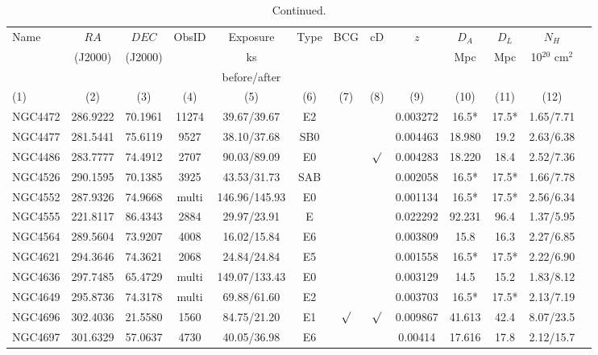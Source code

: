 \documentclass[iop]{emulateapj}
\begin{document}
\setcounter{table}{0}
\begin{table}
\centering
\caption{Continued.}
\begin{tabular}{lcccccccccccc}
\hline
Name      & $RA$ & $DEC$ & ObsID & Exposure & Type & BCG & cD  &  $z$     &  $D_A$ &  $D_L$  &  $N_{H}$ \\
          &  (J2000)   & (J2000)    &       &    ks     &      &   &      &          &   Mpc  &  Mpc    &  10$^{20}$ cm$^{2}$ \\
          &            &            &       & before/after &      &   &     &           &        &         &    \\
   (1)    &    (2)     &    (3)     &   (4) &     (5)      &  (6)  &  (7)  &  (8)   &   (9)  & (10)   &  (11) & (12) \\
\hline
NGC4472 & 286.9222 & 70.1961 & 11274 & 39.67/39.67  & E2  &         & & 0.003272 & 16.5* & 17.5*  & 1.65/7.71 \\
NGC4477 & 281.5441 & 75.6119 & 9527   & 38.10/37.68  & SB0 &    &      & 0.004463 & 18.980 & 19.2 & 2.63/6.38 \\
NGC4486 & 283.7777 & 74.4912 & 2707   & 90.03/89.09  & E0  &    & $\surd$ & 0.004283 & 18.220 & 18.4 & 2.52/7.36 \\
NGC4526 & 290.1595 & 70.1385  & 3925  & 43.53/31.73 & SAB &     &     & 0.002058 & 16.5* & 17.5* & 1.66/7.78  \\
NGC4552 & 287.9326 & 74.9668  & multi & 146.96/145.93 & E0  &     &      & 0.001134 & 16.5* & 17.5* & 2.56/6.34  \\
NGC4555 & 221.8117 & 86.4343  & 2884  & 29.97/23.91 & E  &        &   & 0.022292 & 92.231 & 96.4 & 1.37/5.95  \\
NGC4564 & 289.5604 & 73.9207 & 4008  & 16.02/15.84 & E6  &         &  & 0.003809 & 15.8 & 16.3  &  2.27/6.85  \\
NGC4621 & 294.3646 & 74.3621 & 2068  & 24.84/24.84 & E5 &          && 0.001558 & 16.5*  & 17.5*   &  2.22/6.90 \\
NGC4636 & 297.7485 & 65.4729 & multi  & 149.07/133.43  & E0 &         &  & 0.003129 & 14.5 & 15.2  &  1.83/8.12  \\
NGC4649 & 295.8736 & 74.3178 & multi  & 69.88/61.60  & E2 &           && 0.003703 & 16.5* & 17.5*  &  2.13/7.19  \\
NGC4696 & 302.4036 & 21.5580 & 1560  & 84.75/21.20 & E1 & $\surd$ & $\surd$& 0.009867 & 41.613 & 42.4 & 8.07/23.5  \\
NGC4697 & 301.6329 & 57.0637 &  4730 & 40.05/36.98    & E6   &  &  & 0.00414  & 17.616 & 17.8  &  2.12/15.7  \\

\end{tabular}
\end{table}
\end{document}
